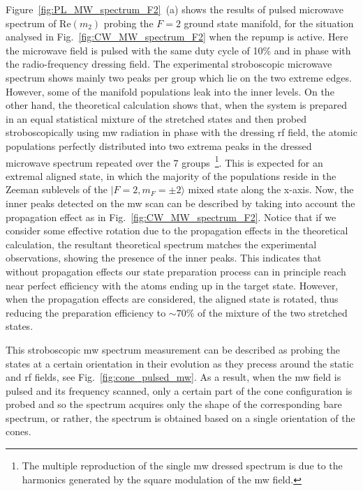 \documentclass[%
reprint,
 amsmath,amssymb,
 aps,
floatfix,
]{revtex4-1}
\begin{document}
Figure~\ref{fig:PL_MW_spectrum_F2}~(a) shows the results of pulsed microwave spectrum  of Re$(m_2)$ probing the $F = 2$ ground state manifold, for the situation analysed in Fig.~\ref{fig:CW_MW_spectrum_F2} when the repump is active.
Here the microwave field is pulsed with the same duty cycle of 10\% and in phase with the radio-frequency dressing field. The experimental stroboscopic microwave spectrum shows %
mainly two peaks per group which lie on the two extreme edges. However, some of the manifold populations leak into the inner levels.
On the other hand, the theoretical calculation shows that, when the system is prepared in an equal statistical mixture of the stretched states and then probed stroboscopically using mw radiation in phase with the dressing rf field, the atomic populations perfectly distributed into two extrema peaks in the dressed microwave spectrum repeated over the 7 groups~\footnote{The multiple reproduction of the single mw dressed spectrum is due to the harmonics generated by the square modulation of the mw field.}. This is expected for an extremal aligned state, in which the majority of the populations reside in the Zeeman sublevels of the $|F = 2,m_F = \pm 2\rangle$ mixed state along the x-axis. Now, the inner peaks detected on the mw scan can be described by  taking into account the propagation effect as in Fig.~\ref{fig:CW_MW_spectrum_F2}. Notice that if we consider some effective rotation due to the propagation effects in the theoretical calculation, the resultant theoretical spectrum matches the experimental observations, showing the presence of the inner peaks. 
This indicates that without propagation effects  our state preparation process can in principle reach near perfect efficiency with the atoms ending up in the target state.
However, when the propagation effects are considered, the aligned state is rotated, thus reducing the preparation efficiency to $\sim 70\%$ of the mixture of the two stretched states.


This stroboscopic mw spectrum measurement can be described as probing the states at a certain orientation in their evolution as they precess around the static and rf fields, see Fig.~\ref{fig:cone_pulsed_mw}. As a result, when the mw field is pulsed and its frequency scanned, only a certain part of the cone configuration is probed and so the spectrum acquires only the shape of the corresponding bare spectrum, or rather, the spectrum is obtained based on a single orientation of the cones. 
\end{document}

